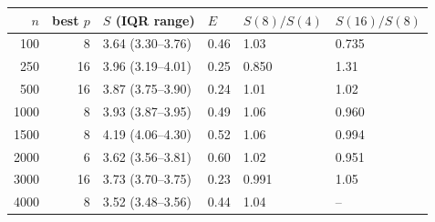 \begin{tabular}{rrllll}
\toprule
$n$ & best $p$ & $S$ (IQR range) & $E$ & $S(8)/S(4)$ & $S(16)/S(8)$ \\
\midrule
100 & 8 & 3.64 (3.30--3.76) & 0.46 & 1.03 & 0.735 \\
250 & 16 & 3.96 (3.19--4.01) & 0.25 & 0.850 & 1.31 \\
500 & 16 & 3.87 (3.75--3.90) & 0.24 & 1.01 & 1.02 \\
1000 & 8 & 3.93 (3.87--3.95) & 0.49 & 1.06 & 0.960 \\
1500 & 8 & 4.19 (4.06--4.30) & 0.52 & 1.06 & 0.994 \\
2000 & 6 & 3.62 (3.56--3.81) & 0.60 & 1.02 & 0.951 \\
3000 & 16 & 3.73 (3.70--3.75) & 0.23 & 0.991 & 1.05 \\
4000 & 8 & 3.52 (3.48--3.56) & 0.44 & 1.04 & -- \\
\bottomrule
\end{tabular}
